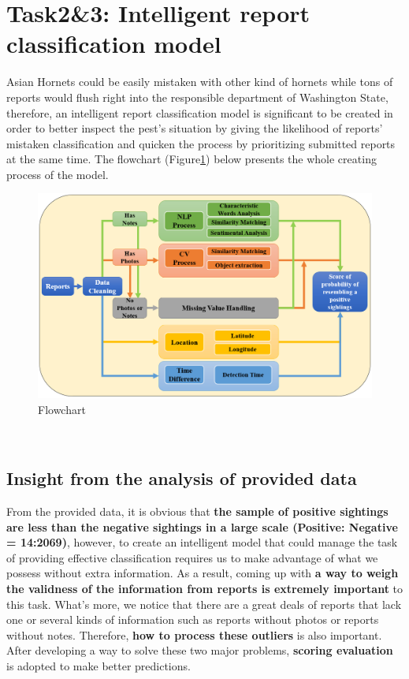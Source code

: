 \documentclass{mcmthesis}
\begin{document}
	\section{Task2\&3: Intelligent report classification model}
	\quad Asian Hornets could be easily mistaken with other kind of hornets while tons of reports would flush right into the responsible department of Washington State, therefore, an intelligent report classification model is significant to be created in order to better inspect the pest's situation by giving the likelihood of reports' mistaken classification and quicken the process by prioritizing submitted reports at the same time. The flowchart (Figure\ref{flow}) below presents the whole creating process of the model.
	\begin{figure}[h]
		\centering
		\includegraphics[scale=0.6]{flow.png}
		\caption{Flowchart}
		\label{flow}
	\end{figure}\\
	\subsection{Insight from the analysis of provided data}
	\quad From the provided data, it is obvious that \textbf{the sample of positive sightings are less than the negative sightings in a large scale (Positive: Negative = 14:2069)}, however, to create an intelligent model that could manage the task of providing effective classification requires us to make advantage of what we possess without extra information. As a result, coming up with \textbf{a way to weigh the validness of the information from reports is extremely important} to this task. What's more, we notice that there are a great deals of reports that lack one or several kinds of information such as reports without photos or reports without notes. Therefore, \textbf{how to process these outliers} is also important. After developing a way to solve these two major problems, \textbf{scoring evaluation} is adopted to make better predictions.
\end{document}
